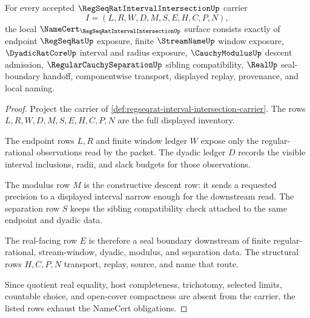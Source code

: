 \begin{theorem}
\label{thm:regseqrat-interval-intersection-namecert-obligations}
For every accepted $\RegSeqRatIntervalIntersectionUp$ carrier
$$
I=(L,R,W,D,M,S,E,H,C,P,N),
$$
the local $\NameCert_{\RegSeqRatIntervalIntersectionUp}$ surface consists exactly of endpoint $\RegSeqRatUp$ exposure, finite $\StreamNameUp$ window exposure, $\DyadicRatCoreUp$ interval and radius exposure, $\CauchyModulusUp$ descent admission, $\RegularCauchySeparationUp$ sibling compatibility, $\RealUp$ seal-boundary handoff, componentwise transport, displayed replay, provenance, and local naming.
\end{theorem}
\begin{proof}
Project the carrier of \autoref{def:regseqrat-interval-intersection-carrier}. The rows $L,R,W,D,M,S,E,H,C,P,N$ are the full displayed inventory.

The endpoint rows $L,R$ and finite window ledger $W$ expose only the regular-rational observations read by the packet. The dyadic ledger $D$ records the visible interval inclusions, radii, and slack budgets for those observations.

The modulus row $M$ is the constructive descent row: it sends a requested precision to a displayed interval narrow enough for the downstream read. The separation row $S$ keeps the sibling compatibility check attached to the same endpoint and dyadic data.

The real-facing row $E$ is therefore a seal boundary downstream of finite regular-rational, stream-window, dyadic, modulus, and separation data. The structural rows $H,C,P,N$ transport, replay, source, and name that route.

Since quotient real equality, host completeness, trichotomy, selected limits, countable choice, and open-cover compactness are absent from the carrier, the listed rows exhaust the NameCert obligations.
\end{proof}

